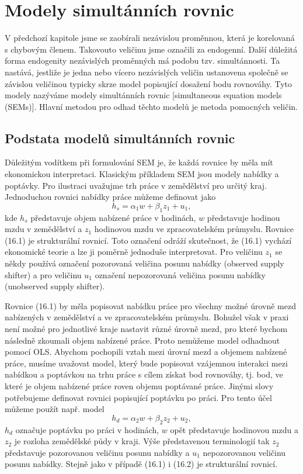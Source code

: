 \chapter{Modely simultánních rovnic}

V předchozí kapitole jsme se zaobírali nezávislou proměnnou, která je korelovaná s chybovým členem. Takovouto veličinu jsme označili za endogenní. Další důležitá forma endogenity nezávislých proměnných má podobu tzv. simultánnosti. Ta nastává, jestliže je jedna nebo vícero nezávislých veličin ustanovena společně se závislou veličinou typicky skrze model popisující dosažení bodu rovnováhy. Tyto modely nazýváme modely simultánních rovnic [simultaneous equation models (SEMs)]. Hlavní metodou pro odhad těchto modelů je metoda pomocných veličin.

\section{Podstata modelů simultánních rovnic}

Důležitým vodítkem při formulování SEM je, že každá rovnice by měla mít ekonomickou interpretaci. Klasickým příkladem SEM jsou modely nabídky a poptávky. Pro ilustraci uvažujme trh práce v zemědělství pro určitý kraj. Jednoduchou rovnici nabídky práce můžeme definovat jako
\begin{equation}
h_s = \alpha_1 w + \beta_1 z_1 + u_1,
\end{equation}
kde $h_s$ představuje objem nabízené práce v hodinách, $w$ představuje hodinou mzdu v zemědělství a $z_1$ hodinovou mzdu ve zpracovatelském průmyslu. Rovnice (16.1) je strukturální rovnicí. Toto označení odráží skutečnost, že (16.1) vychází ekonomické teorie a lze ji poměrně jednoduše interpretovat. Pro veličinu $z_1$ se někdy používá označení pozorovaná veličina posunu nabídky (observed supply shifter) a pro veličinu $u_1$ označení nepozorovaná veličina posunu nabídky (unobserved supply shifter).

Rovnice (16.1) by měla popisovat nabídku práce pro všechny možné úrovně mezd nabízených v zemědělství a ve zpracovatelském průmyslu. Bohužel však v praxi není možné pro jednotlivé kraje nastavit různé úrovně mezd, pro které bychom následně zkoumali objem nabízené práce. Proto nemůžeme model odhadnout pomocí OLS. Abychom pochopili vztah mezi úrovní mezd a objemem nabízené práce, musíme uvažovat model, který bude popisovat vzájemnou interakci mezi nabídkou a poptávkou na trhu práce s cílem získat bod rovnováhy, tj. bod, ve které je objem nabízené práce roven objemu poptávané práce. Jinými slovy potřebujeme definovat rovnici popisující poptávku po práci. Pro tento účel můžeme použít např. model
\begin{equation}
h_d = \alpha_2 w + \beta_2 z_2 + u_2,
\end{equation}
$h_d$ označuje poptávku po práci v hodinách, $w$ opět představuje hodinovou mzdu a $z_2$ je rozloha zemědělské půdy v kraji. Výše představenou terminologií tak $z_2$ představuje pozorovanou veličinu posunu nabídky a $u_1$ nepozorovanou veličinu posunu nabídky. Stejně jako v případě (16.1) i (16.2) je strukturální rovnicí.

